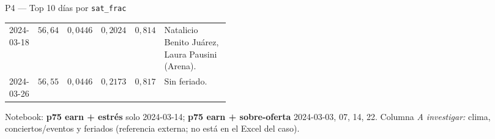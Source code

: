\begin{frame}{P4 — Top 10 días por \texttt{sat\_frac}}
\begin{tabular}{@{}lrrrr>{\raggedright\arraybackslash}p{0.42\linewidth}@{}}
    2024-03-18 & $56{,}64$ & $0{,}0446$ & $0{,}2024$ & $0{,}814$ &
       Natalicio Benito Juárez, Laura Pausini (Arena). \\
    2024-03-26 & $56{,}55$ & $0{,}0446$ & $0{,}2173$ & $0{,}817$ &
      Sin feriado. \\
    \bottomrule
  \end{tabular}
  \par
  \endgroup
  \begin{piegraficafoot}
  Notebook: \textbf{p75 earn + estrés} solo 2024-03-14; \textbf{p75 earn + sobre-oferta} 2024-03-03, 07, 14, 22. Columna \emph{A investigar:} clima, conciertos/eventos y feriados (referencia externa; no está en el Excel del caso).
  \end{piegraficafoot}
\end{frame}


